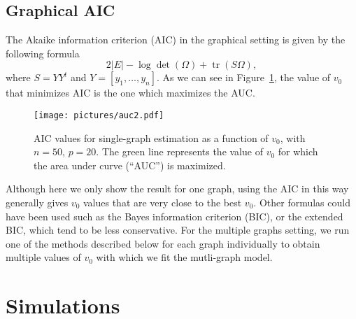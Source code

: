 \documentclass[a4paper, 11pt, oneside]{report}
\DeclareMathOperator{\tr}{tr}
\newcommand{\1}{\mathds{1}}
\begin{document}
\section{Graphical AIC}\label{sect:graphical-aic}
The Akaike information criterion (AIC) in the graphical setting is given by the following formula
\[2|E| - \log\det(\Omega) + \tr(S \Omega),\]
where $S = YY^t$ and $Y = [y_1, \dots, y_n]$.
As we can see in Figure~\ref{fig:aic}, the value of $v_0$ that minimizes AIC is the one which maximizes the AUC.
\begin{figure}[ht]
  \begin{center}
    \texttt{[image: pictures/auc2.pdf]}
  \end{center}
  \caption{AIC values for single-graph estimation as a function of $v_0$, with $n=50$, $p=20$.
  The green line represents the value of $v_0$ for which the area under curve (``AUC'') is maximized.
}
  \label{fig:aic}
\end{figure}
Although here we only show the result for one graph, using the AIC in this way generally gives
$v_0$ values that are very close to the best $v_0$.
Other formulas could have been used such as the Bayes information criterion (BIC), or the
extended BIC, which tend to be less conservative.
For the multiple graphs setting, we run one of the methods described below for each graph individually
to obtain multiple values of $v_0$ with which we fit the mutli-graph model.

\chapter{Simulations}\label{chap:simualtions}
\end{document}
